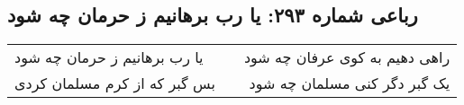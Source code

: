 \begin{center}
\section*{رباعی شماره ۲۹۳: یا رب برهانیم ز حرمان چه شود}
\label{sec:sh293}
\begin{longtable}{l p{0.5cm} r}
یا رب برهانیم ز حرمان چه شود
&&
راهی دهیم به کوی عرفان چه شود
\\
بس گبر که از کرم مسلمان کردی
&&
یک گبر دگر کنی مسلمان چه شود
\\
\end{longtable}
\end{center}
